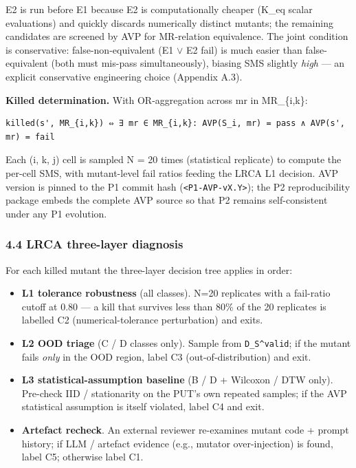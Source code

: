 \documentclass[review,12pt,authoryear]{elsarticle}
\providecommand{\tightlist}{\setlength{\itemsep}{0pt}\setlength{\parskip}{0pt}}
\begin{document}
E2 is run before E1 because E2 is computationally cheaper (K\_eq scalar
evaluations) and quickly discards numerically distinct mutants; the
remaining candidates are screened by AVP for MR-relation equivalence.
The joint condition is conservative: false-non-equivalent (E1 $\vee$ E2 fail)
is much easier than false-equivalent (both must mis-pass
simultaneously), biasing SMS slightly \emph{high} --- an explicit
conservative engineering choice (Appendix A.3).

\textbf{Killed determination.} With OR-aggregation across mr in
MR\_\{i,k\}:

\begin{verbatim}
killed(s', MR_{i,k}) ⇔ ∃ mr ∈ MR_{i,k}: AVP(S_i, mr) = pass ∧ AVP(s', mr) = fail
\end{verbatim}

Each (i, k, j) cell is sampled N = 20 times (statistical replicate) to
compute the per-cell SMS, with mutant-level fail ratios feeding the LRCA
L1 decision. AVP version is pinned to the P1 commit hash
(\texttt{\textless{}P1-AVP-vX.Y\textgreater{}}); the P2 reproducibility
package embeds the complete AVP source so that P2 remains
self-consistent under any P1 evolution.

\subsubsection{4.4 LRCA three-layer
diagnosis}\label{lrca-three-layer-diagnosis}

For each killed mutant the three-layer decision tree applies in order:

\begin{itemize}
\tightlist
\item
  \textbf{L1 tolerance robustness} (all classes). N=20 replicates with a
  fail-ratio cutoff at 0.80 --- a kill that survives less than 80\% of
  the 20 replicates is labelled C2 (numerical-tolerance perturbation)
  and exits.
\item
  \textbf{L2 OOD triage} (C / D classes only). Sample from
  \texttt{D\_S\^{}valid}; if the mutant fails \emph{only} in the OOD
  region, label C3 (out-of-distribution) and exit.
\item
  \textbf{L3 statistical-assumption baseline} (B / D + Wilcoxon / DTW
  only). Pre-check IID / stationarity on the PUT's own repeated samples;
  if the AVP statistical assumption is itself violated, label C4 and
  exit.
\item
  \textbf{Artefact recheck}. An external reviewer re-examines mutant
  code + prompt history; if LLM / artefact evidence (e.g., mutator
  over-injection) is found, label C5; otherwise label C1.
\end{itemize}
\end{document}
